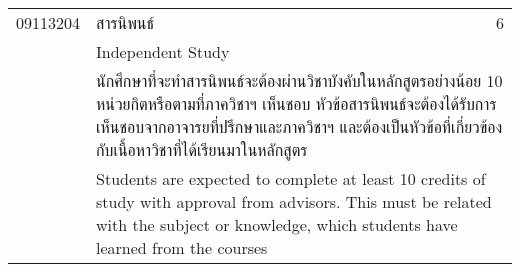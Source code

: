 \begin{longtable}{p{}p{}r{}}
09113204 & สารนิพนธ์ & 6\\
 & Independent Study & \\[1mm]
&  \multicolumn{2}{p{0.75\textwidth}}{นักศึกษาที่จะทำสารนิพนธ์จะต้องผ่านวิชาบังคับในหลักสูตรอย่างน้อย 10 หน่วยกิตหรือตามที่ภาควิชาฯ เห็นชอบ หัวข้อสารนิพนธ์จะต้องได้รับการเห็นชอบจากอาจารยที่ปรึกษาและภาควิชาฯ และต้องเป็นหัวข้อที่เกี่ยวข้องกับเนื้อหาวิชาที่ได้เรียนมาในหลักสูตร} \\
&  \multicolumn{2}{p{0.75\textwidth}}{Students are expected to complete at least 10 credits of study with approval from advisors. This must be related with the subject or knowledge, which students have learned from the courses} \\
\end{longtable}
